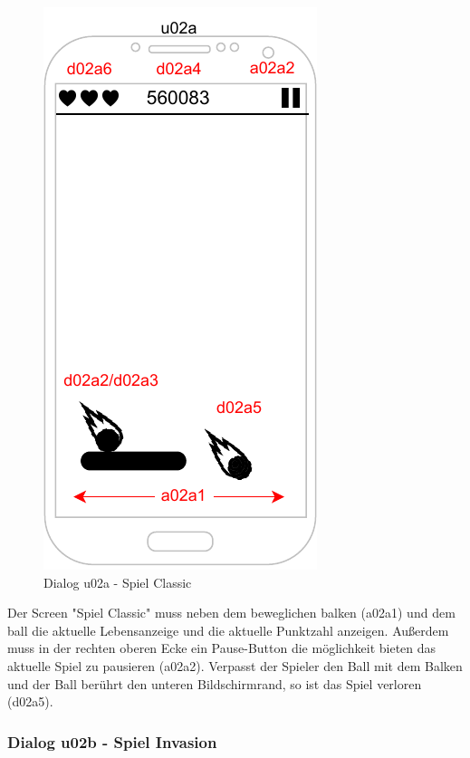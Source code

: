 \begin{figure}
    \begin{center}
    \includegraphics{diagramme/pdf/Mockup-u02a.pdf}
\end{center}
    \caption{Dialog u02a - Spiel Classic}
\end{figure}

Der Screen "Spiel Classic" muss neben dem beweglichen \gls{balken} (a02a1) und dem \gls{ball} die aktuelle Lebensanzeige und die aktuelle Punktzahl anzeigen.
Außerdem muss in der rechten oberen Ecke ein Pause-Button die möglichkeit bieten das aktuelle Spiel zu pausieren (a02a2).
Verpasst der Spieler den Ball mit dem Balken und der Ball berührt den unteren Bildschirmrand, so ist das Spiel verloren (d02a5).
\vspace*{1cm}
\clearpage

\subsubsection{Dialog u02b - Spiel Invasion}

